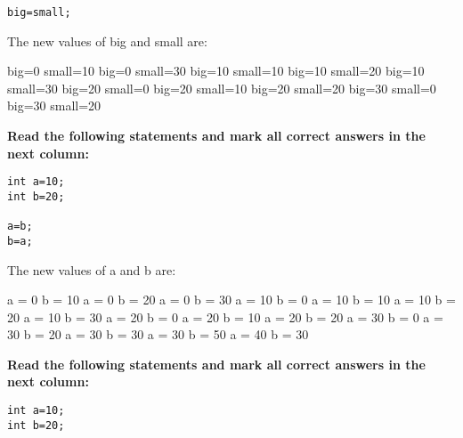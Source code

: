\documentclass[10pt]{exam}
\begin{document}
\begin{questions}
\begin{minipage}[t][][t]{0.18\textwidth}
\begin{lstlisting}
big=small;    
  \end{lstlisting}
\end{minipage}
  \hfill
\begin{minipage}[t][][t]{0.75\textwidth}
  The new values of big and small are:
  \begin{multicols*}{3}
\begin{checkboxes}
    \choice big=0 small=10
    \choice big=0 small=30
    \choice big=10 small=10
    \choice big=10 small=20
    \choice big=10 small=30
    \choice big=20 small=0
    \choice big=20 small=10
    \choice big=20 small=20
    \choice big=30 small=0
    \choice big=30 small=20
  \end{checkboxes}
\end{multicols*}
\end{minipage}

\vspace{1cm}  \begin{minipage}[t][][t]{0.18\textwidth}
\question \bf Read the following statements and mark all correct answers in the next column: \raggedright
  \begin{lstlisting}
int a=10;
int b=20;

a=b;
b=a;
  \end{lstlisting}
\end{minipage}
  \hfill
\begin{minipage}[t][][t]{0.75\textwidth}
  The new values of a and b are:
  \begin{multicols*}{3}
\begin{checkboxes}
    \choice a = 0 b = 10
    \choice a = 0 b = 20
    \choice a = 0 b = 30
    \choice a = 10 b = 0
    \choice a = 10 b = 10
    \choice a = 10 b = 20
    \choice a = 10 b = 30
    \choice a = 20 b = 0
    \choice a = 20 b = 10
    \choice a = 20 b = 20
    \choice a = 30 b = 0
    \choice a = 30 b = 20
    \choice a = 30 b = 30
    \choice a = 30 b = 50
    \choice a = 40 b = 30
  \end{checkboxes}
\end{multicols*}
\end{minipage}

\vspace{1cm}  \begin{minipage}[t][][t]{0.18\textwidth}
\question \bf Read the following statements and mark all correct answers in the next column: \raggedright
  \begin{lstlisting}
int a=10;
int b=20;


\end{lstlisting}
\end{minipage}
\end{questions}
\end{document}
